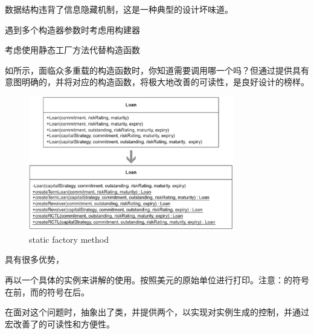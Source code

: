 \begin{content}
数据结构违背了信息隐藏机制，这是一种典型的设计坏味道。

\begin{regulation}
遇到多个构造器参数时考虑用构建器
\end{regulation}

\begin{regulation}
考虑使用静态工厂方法代替构造函数
\end{regulation}

如所示，面临众多重载的构造函数时，你知道需要调用哪一个吗？但通过提供具有意图明确的，并将对应的构造函数，将极大地改善的可读性，是良好设计的榜样。

\begin{figure}[H]
  \centering
  \includegraphics[width=0.8\textwidth]{figures/static-factory}
  \caption{static factory method}
  \label{fig:static-factory}
\end{figure}

具有很多优势，
\begin{enum}
\end{enum}

再以一个具体的实例来讲解的使用。按照美元的原始单位进行打印。注意：的符号在前，而的符号在后。
\begin{enum}
\end{enum}

在面对这个问题时，抽象出了类，并提供两个，以实现对实例生成的控制，并通过宏改善了的可读性和方便性。


\end{content}

